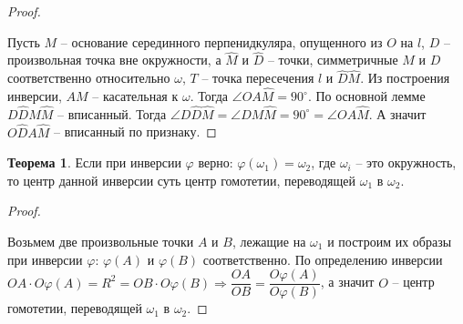 \documentclass[12pt]{article}
\theoremstyle{definition}
\newtheorem{theorem}{Теорема}[section]
\begin{document}
\begin{proof}
\begin{center}
        \end{center}
        Пусть $M$ -- основание серединного перпенидкуляра, опущенного из $O$ на $l$, $D$ -- произвольная точка вне окружности, а $\widehat{M}$ и $\widehat{D}$ -- точки, симметричные $M$ и $D$ соответственно относительно $\omega$, $T$ -- точка пересечения $l$ и $\widehat{D}\widehat{M}$. Из построения инверсии, $AM$ -- касательная к $\omega$. Тогда $\angle OA\widehat{M}=90^{\circ}$. По основной лемме $D\widehat{D}M\widehat{M}$ -- вписанный. Тогда $\angle D\widehat{D}\widehat{M}=\angle DM\widehat{M}=90^{\circ}=\angle OA\widehat{M}$. А значит $O\widehat{D}A\widehat{M}$ -- вписанный по признаку.
    \end{proof}
    \begin{theorem}
        Если при инверсии $\varphi$ верно: $\varphi(\omega_1)=\omega_2$, где $\omega_i$ -- это  окружность, то центр данной инверсии суть центр гомотетии, переводящей $\omega_1$ в $\omega_2$.
    \end{theorem}
    \begin{proof}
        $ $\newline
        \begin{center}
        \end{center}
        Возьмем две произвольные точки $A$ и $B$, лежащие на $\omega_1$ и построим их образы при инверсии $\varphi$: $\varphi(A)$ и $\varphi(B)$ соответственно. По определению инверсии $OA\cdot O\varphi(A)=R^2=OB\cdot O\varphi(B)\Longrightarrow \dfrac{OA}{OB}=\dfrac{O\varphi(A)}{O\varphi(B)}$, а значит $O$ -- центр гомотетии, переводящей $\omega_1$ в $\omega_2$.
    \end{proof}
\end{document}
